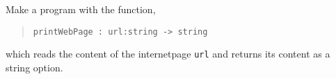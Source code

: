 Make a program with the function,
\begin{quote}
  \mbox{\lstinline!printWebPage : url:string -> string!}
\end{quote}
which reads the content of the internetpage \lstinline!url! and
returns its content as a string option.
